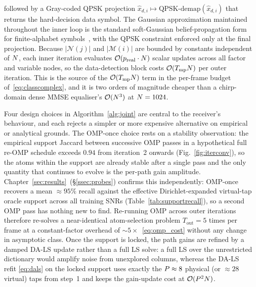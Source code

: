 followed by a Gray-coded QPSK projection $\hat{x}_{d,i} \mapsto \mathrm{QPSK\text{-}demap}(\hat{x}_{d,i})$ that returns the hard-decision data symbol. The Gaussian approximation maintained throughout the inner loop is the standard soft-Gaussian belief-propagation form for finite-alphabet symbols~\cite{wymeersch2007iterativereceiver}, with the QPSK constraint enforced only at the final projection. Because $|\mathcal{N}(j)|$ and $|\mathcal{M}(i)|$ are bounded by constants independent of $N$, each inner iteration evaluates $\mathcal{O}(p_{\mathrm{real}} \cdot N)$ scalar updates across all factor and variable nodes, so the data-detection block costs $\mathcal{O}(T_\text{mp} N)$ per outer iteration. This is the source of the $\mathcal{O}(T_\text{mp} N)$ term in the per-frame budget of~\eqref{eq:classcomplex}, and it is two orders of magnitude cheaper than a chirp-domain dense MMSE equaliser's $\mathcal{O}(N^3)$ at $N = 1024$.

Four design choices in Algorithm~\ref{alg:joint} are central to the receiver's behaviour, and each rejects a simpler or more expensive alternative on empirical or analytical grounds. The OMP-once choice rests on a stability observation: the empirical support Jaccard between successive OMP passes in a hypothetical full re-OMP schedule exceeds $0.94$ from iteration~2 onwards (Fig.~\ref{fig:iterconv}), so the atoms within the support are already stable after a single pass and the only quantity that continues to evolve is the per-path gain amplitude. Chapter~\ref{sec:results}~(\S\ref{ssec:probes}) confirms this independently: OMP-once recovers a mean $\approx 95\%$ recall against the effective Dirichlet-expanded virtual-tap oracle support across all training SNRs (Table~\ref{tab:supportrecall}), so a second OMP pass has nothing new to find. Re-running OMP across outer iterations therefore re-solves a near-identical atom-selection problem $T_\text{out} = 5$ times per frame at a constant-factor overhead of $\sim 5\times$~\eqref{eq:omp_cost} without any change in asymptotic class. Once the support is locked, the path gains are refined by a damped DA-LS update rather than a full LS solve: a full LS over the unrestricted dictionary would amplify noise from unexplored columns, whereas the DA-LS refit \eqref{eq:dals} on the locked support uses exactly the $P \approx 8$ physical (or $\approx 28$ virtual) taps from step~1 and keeps the gain-update cost at $\mathcal{O}(P^2 N)$.


